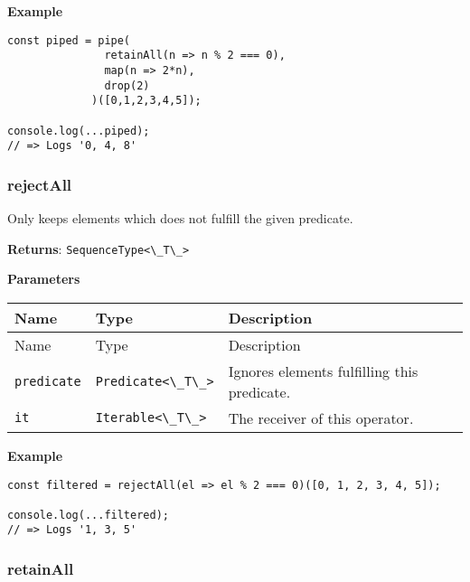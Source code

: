 \textbf{Example}

\begin{lstlisting}[label=389d95f0-7103-4244-a572-b4a0457aa4ae]
const piped = pipe(
               retainAll(n => n % 2 === 0),
               map(n => 2*n),
               drop(2)
             )([0,1,2,3,4,5]);
                                           
console.log(...piped);
// => Logs '0, 4, 8'
\end{lstlisting}

\hypertarget{fa673517-e861-4391-b582-0decb366cb72}{%
\subsubsection{rejectAll}\label{fa673517-e861-4391-b582-0decb366cb72}}

Only keeps elements which does not fulfill the given predicate.

\textbf{Returns}: \passthrough{\lstinline!SequenceType<\_T\_>!}

\textbf{Parameters}

\begin{longtable}[]{
  >{\raggedright\arraybackslash}p{}
  >{\raggedright\arraybackslash}p{}
  >{\raggedright\arraybackslash}p{}@{}}

\toprule\noalign{}
Name & Type & Description \\
\midrule\noalign{}
\endfirsthead
\toprule\noalign{}
Name & Type & Description \\
\midrule\noalign{}
\endhead
\bottomrule\noalign{}
\endlastfoot
\passthrough{\lstinline!predicate!} &
\passthrough{\lstinline!Predicate<\_T\_>!} & Ignores elements fulfilling
this predicate. \\
\passthrough{\lstinline!it!} & \passthrough{\lstinline!Iterable<\_T\_>!}
& The receiver of this operator. \\
\end{longtable}

\textbf{Example}

\begin{lstlisting}[label=a0a61f28-ccde-43a7-b440-9cfb64243aaf]
const filtered = rejectAll(el => el % 2 === 0)([0, 1, 2, 3, 4, 5]);

console.log(...filtered);
// => Logs '1, 3, 5'
\end{lstlisting}

\hypertarget{cfd0f69c-c3d5-4e1b-90f6-c7f1dd9d258e}{%
\subsubsection{retainAll}\label{cfd0f69c-c3d5-4e1b-90f6-c7f1dd9d258e}}


